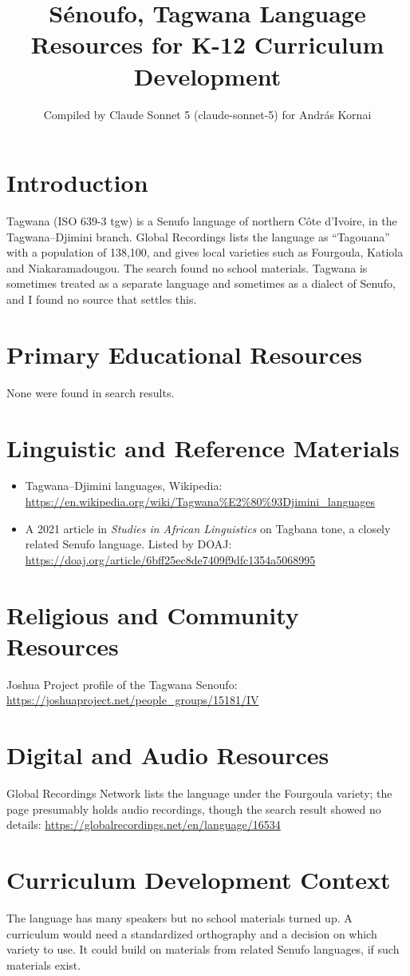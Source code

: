 \documentclass[12pt]{article}
\title{S\'enoufo, Tagwana Language Resources for K-12 Curriculum Development}
\author{Compiled by Claude Sonnet 5 (claude-sonnet-5) for Andr\'as Kornai}
\date{}
\begin{document}
\maketitle

\section{Introduction}
Tagwana (ISO 639-3 tgw) is a Senufo language of northern C\^ote d'Ivoire, in the Tagwana--Djimini branch. Global Recordings lists the language as ``Tagouana'' with a population of 138,100, and gives local varieties such as Fourgoula, Katiola and Niakaramadougou. The search found no school materials. Tagwana is sometimes treated as a separate language and sometimes as a dialect of Senufo, and I found no source that settles this.

\section{Primary Educational Resources}
None were found in search results.

\section{Linguistic and Reference Materials}
\begin{itemize}
\item Tagwana--Djimini languages, Wikipedia: \url{https://en.wikipedia.org/wiki/Tagwana%E2%80%93Djimini_languages}
\item A 2021 article in \emph{Studies in African Linguistics} on Tagbana tone, a closely related Senufo language. Listed by DOAJ: \url{https://doaj.org/article/6bff25ec8de7409f9dfc1354a5068995}
\end{itemize}

\section{Religious and Community Resources}
Joshua Project profile of the Tagwana Senoufo: \url{https://joshuaproject.net/people_groups/15181/IV}

\section{Digital and Audio Resources}
Global Recordings Network lists the language under the Fourgoula variety; the page presumably holds audio recordings, though the search result showed no details: \url{https://globalrecordings.net/en/language/16534}

\section{Curriculum Development Context}
The language has many speakers but no school materials turned up. A curriculum would need a standardized orthography and a decision on which variety to use. It could build on materials from related Senufo languages, if such materials exist.
\end{document}
